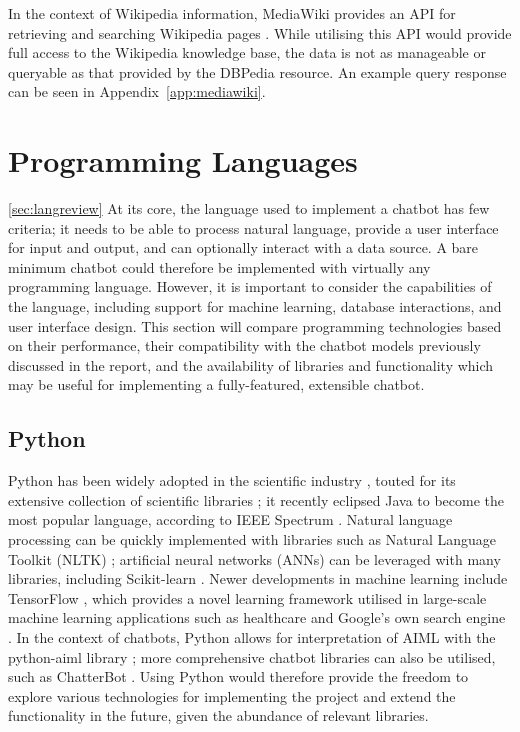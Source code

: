 In the context of Wikipedia information, MediaWiki provides an API for retrieving and searching Wikipedia pages \cite{mediawiki}. While utilising this API would provide full access to the Wikipedia knowledge base, the data is not as manageable or queryable as that provided by the DBPedia resource. An example query response can be seen in Appendix~\ref{app:mediawiki}.

\newpage
\section{Programming Languages}
\ref{sec:langreview}
At its core, the language used to implement a chatbot has few criteria; it needs to be able to process natural language, provide a user interface for input and output, and can optionally interact with a data source. A bare minimum chatbot could therefore be implemented with virtually any programming language. However, it is important to consider the capabilities of the language, including support for machine learning, database interactions, and user interface design. This section will compare programming technologies based on their performance, their compatibility with the chatbot models previously discussed in the report, and the availability of libraries and functionality which may be useful for implementing a fully-featured, extensible chatbot.
 
\subsection{Python}
Python has been widely adopted in the scientific industry \cite{bird2009natural}, touted for its extensive collection of scientific libraries \cite{koepke2011python}; it recently eclipsed Java to become the most popular language, according to IEEE Spectrum \cite{cass2019}. Natural language processing can be quickly implemented with libraries such as Natural Language Toolkit (NLTK) \cite{nltk2019}; artificial neural networks (ANNs) can be leveraged with many libraries, including Scikit-learn \cite{pedregosa2011scikit}. Newer developments in machine learning include TensorFlow \cite{abadi2016tensorflow}, which provides a novel learning framework utilised in large-scale machine learning applications such as healthcare \cite{polzin2019} and Google’s own search engine \cite{pichai2015}. In the context of chatbots, Python allows for interpretation of AIML with the python-aiml library \cite{villegas2019}; more comprehensive chatbot libraries can also be utilised, such as ChatterBot \cite{cox2019}. Using Python would therefore provide the freedom to explore various technologies for implementing the project and extend the functionality in the future, given the abundance of relevant libraries.

